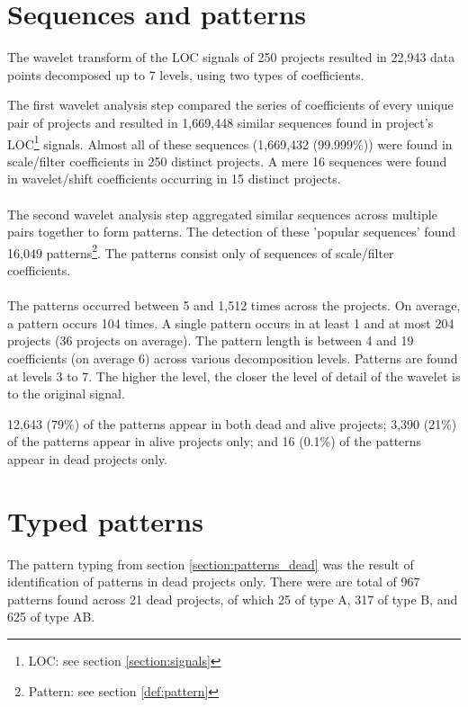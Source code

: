 \section{Sequences and patterns}
The wavelet transform of the LOC signals of 250 projects resulted in 22,943
data points decomposed up to 7 levels, using two types of coefficients.

The first wavelet analysis step compared the series of coefficients of every
unique pair of projects and resulted in 1,669,448 similar sequences found in
project's LOC\footnote{LOC: see section \ref{section:signals}} signals. Almost
all of these sequences (1,669,432 (99.999\%)) were found in scale/filter
coefficients in 250 distinct projects.
A mere 16 sequences were found in wavelet/shift coefficients occurring in 15
distinct projects.

\paragraph{}
The second wavelet analysis step aggregated similar sequences across multiple
pairs together to form patterns. The detection of these 'popular sequences'
found 16,049 patterns\footnote{Pattern: see section \ref{def:pattern}}. The
patterns consist only of sequences of scale/filter coefficients.

\paragraph{}
The patterns occurred between 5 and 1,512 times across the projects. On
average, a pattern occurs 104 times. A single pattern occurs in at least 1 and
at most 204 projects (36 projects on average). The pattern length is between 4
and 19 coefficients (on average 6) across various decomposition levels.
Patterns are found at levels 3 to 7. The higher the level, the closer the level
of detail of the wavelet is to the original signal.

12,643 (79\%) of the patterns appear in both dead and alive projects; 3,390
(21\%) of the patterns appear in alive projects only; and 16 (0.1\%) of the
patterns appear in dead projects only.

\section{Typed patterns}
The pattern typing from section \ref{section:patterns_dead} was the result of
identification of patterns in dead projects only. There were are total of 967
patterns found across 21 dead projects, of which 25 of type A, 317 of type B,
and 625 of type AB.


